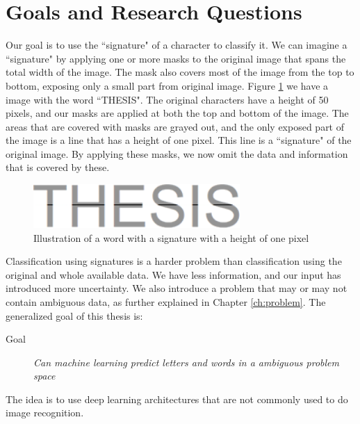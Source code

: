 
\section{Goals and Research Questions}
\label{sec:goals_and_research_questions}
Our goal is to use the ``signature" of a character to classify it. We can imagine a ``signature" by applying one or more masks to the original image that spans the total width of the image. The mask also covers most of the image from the top to bottom, exposing only a small part from original image. Figure \ref{fig:thesis-signature} we have a image with the word ``THESIS". The original characters have a height of 50 pixels, and our masks are applied at both the top and bottom of the image. The areas that are covered with masks are grayed out, and the only exposed part of the image is a line that has a height of one pixel. This line is a ``signature" of the original image. By applying these masks, we now omit the data and information that is covered by these.

\begin{figure}[ht]
    \centering
    \includegraphics[width=0.7\textwidth]{fig/chapter1/signature.png}
    \caption{Illustration of a word with a signature with a height of one pixel}
    \label{fig:thesis-signature}
\end{figure}

Classification using signatures is a harder problem than classification using the original and whole available data. We have less information, and our input has introduced more uncertainty. We also introduce a problem that may or may not contain ambiguous data, as further explained in Chapter \ref{ch:problem}. The generalized goal of this thesis is:

\begin{description}
\item[Goal] {\textit{Can machine learning predict letters and words in a ambiguous problem space}}
\end{description}

The idea is to use deep learning architectures that are not commonly used to do image recognition. 



